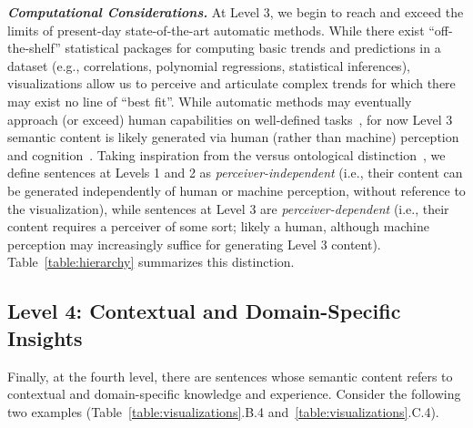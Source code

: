 \textbf{\emph{Computational Considerations.}}
At Level 3, we begin to reach and exceed the limits of present-day state-of-the-art automatic methods.
While there exist ``off-the-shelf'' statistical packages for computing basic trends and predictions in a dataset (e.g., correlations, polynomial regressions, statistical inferences), visualizations allow us to perceive and articulate complex trends for which there may exist no line of ``best fit''.
While automatic methods may eventually approach (or exceed) human capabilities on well-defined tasks~\cite{obeid_chart--text_2020}, for now Level 3 semantic content is likely generated via human (rather than machine) perception and cognition~\cite{morash_guiding_2015}.
Taking inspiration from the  versus  ontological distinction~\cite{ali_mind-dependent_2016}, we define sentences at Levels 1 and 2 as \emph{perceiver-independent} (i.e., their content can be generated independently of human or machine perception, without reference to the visualization), while sentences at Level 3 are \emph{perceiver-dependent} (i.e., their content requires a perceiver of some sort; likely a human, although machine perception may increasingly suffice for generating Level 3 content).
Table~\ref{table:hierarchy} summarizes this distinction.

\subsection{Level 4: Contextual and Domain-Specific Insights}

Finally, at the fourth level, there are sentences whose semantic content refers to contextual and domain-specific knowledge and experience.
Consider the following two examples (Table~\ref{table:visualizations}.B.4 and~\ref{table:visualizations}.C.4).
\begin{quote}
    \small
    \vspace{-1mm}
    \textcolor{white}{}
    \vspace{-1mm}
\end{quote}


